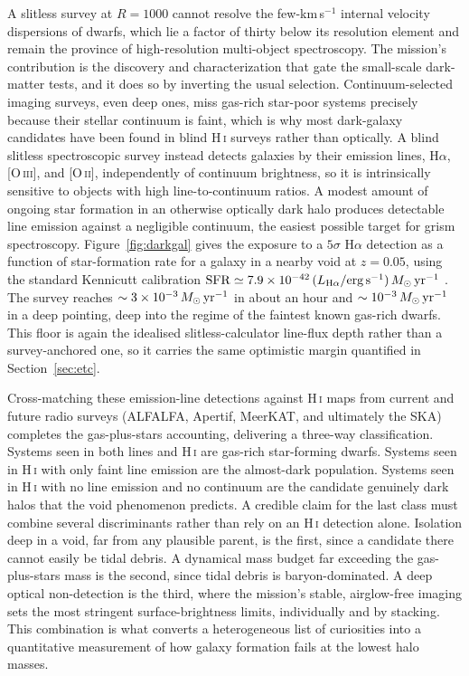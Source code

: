 \documentclass[10pt,onecolumn]{article}
\begin{document}
A slitless survey at $R=1000$ cannot resolve the few-km\,s$^{-1}$ internal velocity dispersions of dwarfs, which lie a factor of thirty below its resolution element and remain the province of high-resolution multi-object spectroscopy. The mission's contribution is the discovery and characterization that gate the small-scale dark-matter tests, and it does so by inverting the usual selection. Continuum-selected imaging surveys, even deep ones, miss gas-rich star-poor systems precisely because their stellar continuum is faint, which is why most dark-galaxy candidates have been found in blind H\,\textsc{i} surveys rather than optically. A blind slitless spectroscopic survey instead detects galaxies by their emission lines, H$\alpha$, [O\,\textsc{iii}], and [O\,\textsc{ii}], independently of continuum brightness, so it is intrinsically sensitive to objects with high line-to-continuum ratios. A modest amount of ongoing star formation in an otherwise optically dark halo produces detectable line emission against a negligible continuum, the easiest possible target for grism spectroscopy. Figure~\ref{fig:darkgal} gives the exposure to a $5\sigma$ H$\alpha$ detection as a function of star-formation rate for a galaxy in a nearby void at $z=0.05$, using the standard Kennicutt calibration ${\rm SFR}\simeq7.9\times10^{-42}\,(L_{\rm H\alpha}/{\rm erg\,s^{-1}})\,M_\odot\,{\rm yr^{-1}}$ \cite{kennicutt1998}. The survey reaches $\sim3\times10^{-3}\,M_\odot\,{\rm yr}^{-1}$ in about an hour and $\sim10^{-3}\,M_\odot\,{\rm yr}^{-1}$ in a deep pointing, deep into the regime of the faintest known gas-rich dwarfs. This floor is again the idealised slitless-calculator line-flux depth rather than a survey-anchored one, so it carries the same optimistic margin quantified in Section~\ref{sec:etc}.

Cross-matching these emission-line detections against H\,\textsc{i} maps from current and future radio surveys (ALFALFA, Apertif, MeerKAT, and ultimately the SKA) completes the gas-plus-stars accounting, delivering a three-way classification. Systems seen in both lines and H\,\textsc{i} are gas-rich star-forming dwarfs. Systems seen in H\,\textsc{i} with only faint line emission are the almost-dark population. Systems seen in H\,\textsc{i} with no line emission and no continuum are the candidate genuinely dark halos that the void phenomenon predicts. A credible claim for the last class must combine several discriminants rather than rely on an H\,\textsc{i} detection alone. Isolation deep in a void, far from any plausible parent, is the first, since a candidate there cannot easily be tidal debris. A dynamical mass budget far exceeding the gas-plus-stars mass is the second, since tidal debris is baryon-dominated. A deep optical non-detection is the third, where the mission's stable, airglow-free imaging sets the most stringent surface-brightness limits, individually and by stacking. This combination is what converts a heterogeneous list of curiosities into a quantitative measurement of how galaxy formation fails at the lowest halo masses.
\end{document}
